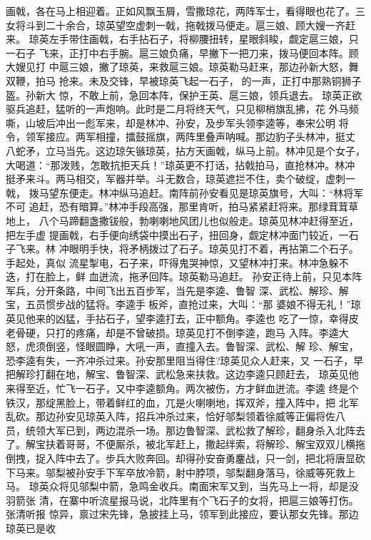 画戟，各在马上相迎着。正如风飘玉屑，雪撒琼花，两阵军士，看得眼也花了。三
女将斗到二十余合，琼英望空虚刺一戟，拖戟拨马便走。扈三娘、顾大嫂一齐赶来。
琼英左手带住画戟，右手拈石子，将柳腰扭转，星眼斜睃，觑定扈三娘，只一石子
飞来，正打中右手腕。扈三娘负痛，早撇下一把刀来，拨马便回本阵。顾大嫂见打
中扈三娘，撇了琼英，来救扈三娘。琼英勒马赶来，那边孙新大怒，舞双鞭，拍马
抢来。未及交锋，早被琼英飞起一石子，的一声，正打中那熟铜狮子盔。孙新大
惊，不敢上前，急回本阵，保护王英、扈三娘，领兵退去。
琼英正欲驱兵追赶，猛听的一声炮响。此时是二月将终天气，只见柳梢旗乱拂，花
外马频嘶，山坡后冲出一彪军来，却是林冲、孙安，及步军头领李逵等，奉宋公明
将令，领军接应。两军相撞，擂鼓摇旗，两阵里叠声呐喊。那边豹子头林冲，挺丈
八蛇矛，立马当先。这边琼矢镞琼英，拈方天画戟，纵马上前。林冲见是个女子，
大喝道：“那泼贱，怎敢抗拒天兵！”琼英更不打话，拈戟拍马，直抢林冲。林冲
挺矛来斗。两马相交，军器并举。斗无数合，琼英遮拦不住，卖个破绽，虚刺一戟，
拨马望东便走。林冲纵马追赶。南阵前孙安看见是琼英旗号，大叫：“林将军不可
追赶，恐有暗算。”林冲手段高强，那里肯听，拍马紧紧赶将来。那绿茸茸草地上，
八个马蹄翻盏撒钹般，勃喇喇地风团儿也似般走。琼英见林冲赶得至近，把左手虚
提画戟，右手便向绣袋中摸出石子，扭回身，觑定林冲面门较近，一石子飞来。林
冲眼明手快，将矛柄拨过了石子。琼英见打不着，再拈第二个石子。手起处，真似
流星掣电，石子来，吓得鬼哭神惊，又望林冲打来。林冲急躲不迭，打在脸上，鲜
血迸流，拖矛回阵。琼英勒马追赶。
孙安正待上前，只见本阵军兵，分开条路，中间飞出五百步军，当先是李逵、鲁智
深、武松、解珍、解宝，五员惯步战的猛将。李逵手板斧，直抢过来，大叫：“那
婆娘不得无礼！”琼英见他来的凶猛，手拈石子，望李逵打去，正中额角。李逵也
吃了一惊，幸得皮老骨硬，只打的疼痛，却是不曾破损。琼英见打不倒李逵，跑马
入阵。李逵大怒，虎须倒竖，怪眼圆睁，大吼一声，直撞入去。鲁智深、武松、解
珍、解宝，恐李逵有失，一齐冲杀过来。孙安那里阻当得住?琼英见众人赶来，又
一石子，早把解珍打翻在地，解宝、鲁智深、武松急来扶救。这边李逵只顾赶去，
琼英见他来得至近，忙飞一石子，又中李逵额角。两次被伤，方才鲜血迸流。李逵
终是个铁汉，那绽黑脸上，带着鲜红的血，兀是火喇喇地，挥双斧，撞入阵中，把
北军乱砍。那边孙安见琼英入阵，招兵冲杀过来，恰好邬梨领着徐威等正偏将佐八
员，统领大军已到，两边混杀一场。那边鲁智深、武松救了解珍，翻身杀入北阵去
了。解宝扶着哥哥，不便厮杀，被北军赶上，撒起绊索，将解珍、解宝双双儿横拖
倒拽，捉入阵中去了。步兵大败奔回。却得孙安奋勇鏖战，只一剑，把北将唐显砍
下马来。邬梨被孙安手下军卒放冷箭，射中脖项，邬梨翻身落马，徐威等死救上马。
琼英众将见邬梨中箭，急鸣金收兵。南面宋军又到，当先马上一将，却是没羽箭张
清，在寨中听流星报马说，北阵里有个飞石子的女将，把扈三娘等打伤。张清听报
惊异，禀过宋先锋，急披挂上马，领军到此接应，要认那女先锋。那边琼英已是收
